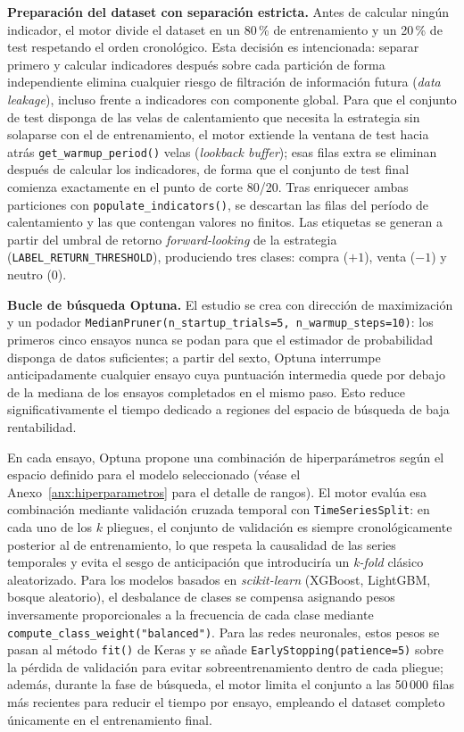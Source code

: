 \textbf{Preparación del dataset con separación estricta.}
Antes de calcular ningún indicador, el motor divide el dataset en un 80\,\%
de entrenamiento y un 20\,\% de test respetando el orden cronológico. Esta
decisión es intencionada: separar primero y calcular indicadores después
sobre cada partición de forma independiente elimina cualquier riesgo de
filtración de información futura (\textit{data leakage}), incluso frente a
indicadores con componente global. Para que el conjunto de test disponga de
las velas de calentamiento que necesita la estrategia sin solaparse con el
de entrenamiento, el motor extiende la ventana de test hacia atrás
\texttt{get\_warmup\_period()} velas (\textit{lookback buffer}); esas filas
extra se eliminan después de calcular los indicadores, de forma que el
conjunto de test final comienza exactamente en el punto de corte 80/20.
Tras enriquecer ambas particiones con \texttt{populate\_indicators()}, se
descartan las filas del período de calentamiento y las que contengan valores
no finitos. Las etiquetas se generan a partir del umbral de retorno
\textit{forward-looking} de la estrategia (\texttt{LABEL\_RETURN\_THRESHOLD}),
produciendo tres clases: compra ($+1$), venta ($-1$) y neutro ($0$).

\textbf{Bucle de búsqueda Optuna.}
El estudio se crea con dirección de maximización y un podador
\texttt{MedianPruner(n\_startup\_trials=5, n\_warmup\_steps=10)}: los
primeros cinco ensayos nunca se podan para que el estimador de probabilidad
disponga de datos suficientes; a partir del sexto, Optuna interrumpe
anticipadamente cualquier ensayo cuya puntuación intermedia quede por debajo
de la mediana de los ensayos completados en el mismo paso. Esto reduce
significativamente el tiempo dedicado a regiones del espacio de búsqueda de
baja rentabilidad.

En cada ensayo, Optuna propone una combinación de hiperparámetros según el
espacio definido para el modelo seleccionado (véase el Anexo~\ref{anx:hiperparametros}
para el detalle de rangos). El motor evalúa esa combinación mediante
validación cruzada temporal con \texttt{TimeSeriesSplit}: en cada uno de los
$k$ pliegues, el conjunto de validación es siempre cronológicamente posterior
al de entrenamiento, lo que respeta la causalidad de las series temporales y
evita el sesgo de anticipación que introduciría un \textit{k-fold} clásico
aleatorizado. Para los modelos basados en \textit{scikit-learn} (XGBoost,
LightGBM, bosque aleatorio), el desbalance de clases se compensa asignando
pesos inversamente proporcionales a la frecuencia de cada clase mediante
\texttt{compute\_class\_weight("balanced")}. Para las redes neuronales,
estos pesos se pasan al método \texttt{fit()} de Keras y se añade
\texttt{EarlyStopping(patience=5)} sobre la pérdida de validación para
evitar sobreentrenamiento dentro de cada pliegue; además, durante la fase de
búsqueda, el motor limita el conjunto a las 50\,000 filas más recientes para
reducir el tiempo por ensayo, empleando el dataset completo únicamente en el
entrenamiento final.

